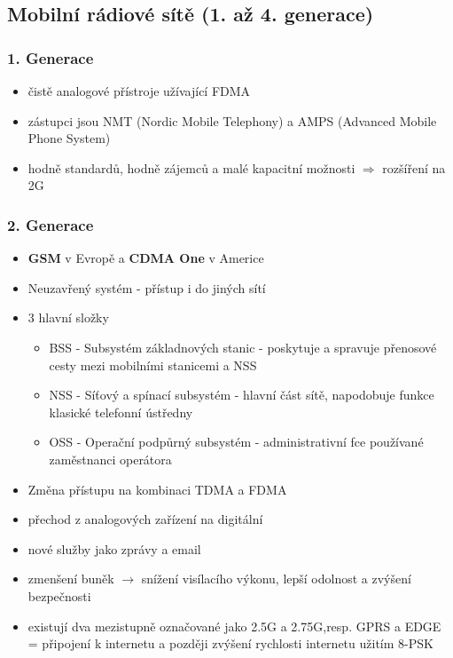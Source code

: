 \documentclass[10pt,a4paper]{article}
\begin{document}
\subsection{Mobilní rádiové sítě (1. až 4. generace)}
\subsubsection{1. Generace}

\begin{itemize}
\item čistě analogové přístroje užívající FDMA
\item zástupci jsou NMT (Nordic Mobile Telephony) a AMPS (Advanced Mobile Phone System)
\item hodně standardů, hodně zájemců a malé kapacitní možnosti $\Rightarrow$ rozšíření na 2G
\end{itemize}
\subsubsection{2. Generace}

\begin{itemize}
\item \textbf{GSM} v Evropě a \textbf{CDMA One} v Americe
\item Neuzavřený systém - přístup i do jiných sítí
\item 3 hlavní složky
\begin{itemize}
\item BSS - Subsystém základnových stanic - poskytuje a spravuje přenosové cesty mezi mobilními stanicemi a NSS
\item NSS - Síťový a spínací subsystém - hlavní část sítě, napodobuje funkce klasické telefonní ústředny
\item OSS - Operační podpůrný subsystém - administrativní fce používané zaměstnanci operátora
\end{itemize}
\item Změna přístupu na kombinaci TDMA a FDMA
\item přechod z analogových zařízení na digitální
\item nové služby jako zprávy a email
\item zmenšení buněk $\rightarrow$ snížení visílacího výkonu, lepší odolnost a zvýšení bezpečnosti
\item existují dva mezistupně označované jako 2.5G a 2.75G,resp. GPRS a EDGE = připojení k internetu a později zvýšení rychlosti internetu užitím 8-PSK
\end{itemize}
\end{document}
